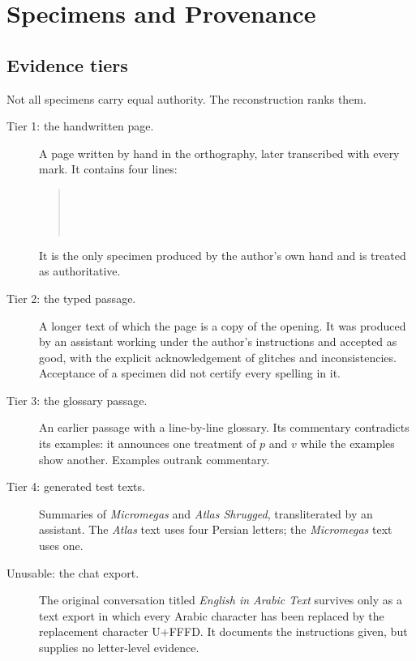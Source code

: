 \chapter{Specimens and Provenance}

\section{Evidence tiers}
Not all specimens carry equal authority. The reconstruction ranks them.

\begin{description}
\item[Tier 1: the handwritten page.] A page written by hand in the orthography, later transcribed with every mark. It contains four lines:
\begin{quote}\\
\\
\\
\end{quote}
It is the only specimen produced by the author's own hand and is treated as authoritative.
\item[Tier 2: the typed passage.] A longer text of which the page is a copy of the opening. It was produced by an assistant working under the author's instructions and accepted as good, with the explicit acknowledgement of glitches and inconsistencies. Acceptance of a specimen did not certify every spelling in it.
\item[Tier 3: the glossary passage.] An earlier passage with a line-by-line glossary. Its commentary contradicts its examples: it announces one treatment of $p$ and $v$ while the examples show another. Examples outrank commentary.
\item[Tier 4: generated test texts.] Summaries of \emph{Micromegas} and \emph{Atlas Shrugged}, transliterated by an assistant. The \emph{Atlas} text uses four Persian letters; the \emph{Micromegas} text uses one.
\item[Unusable: the chat export.] The original conversation titled \emph{English in Arabic Text} survives only as a text export in which every Arabic character has been replaced by the replacement character U+FFFD. It documents the instructions given, but supplies no letter-level evidence.
\end{description}

